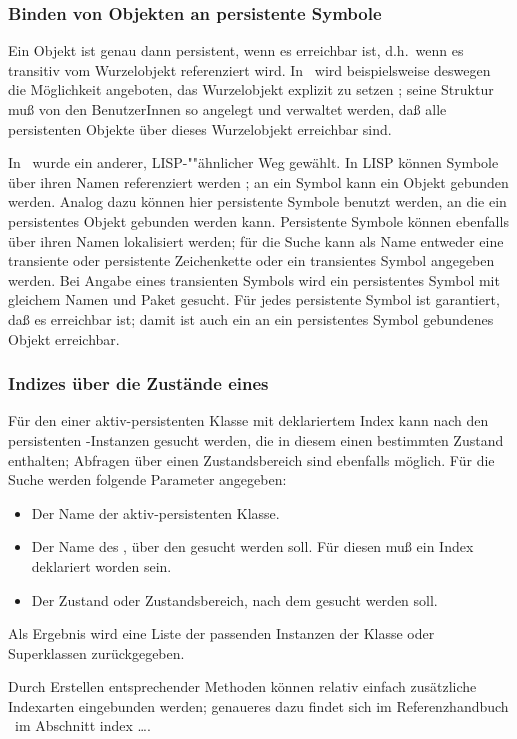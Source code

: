 \subsubsection{Binden von Objekten an persistente Symbole}%
\label{sec:psym}
%
Ein Objekt ist genau dann persistent, wenn es erreichbar ist, d.h.\
wenn es transitiv vom Wurzelobjekt referenziert wird. In
\wood\ wird beispielsweise deswegen die M\"{o}glichkeit angeboten, das
Wurzelobjekt explizit zu setzen \cite{bib:wo93}; seine Struktur mu\ss{}
von den BenutzerInnen so angelegt und verwaltet werden, da\ss{} alle
persistenten Objekte \"{u}ber dieses Wurzelobjekt erreichbar sind.
%
\par{}In \plob\ wurde ein anderer, LISP-""\"{a}hn\-li\-cher Weg gew\"{a}hlt.
In LISP k\"{o}n\-nen Symbole \"{u}ber ihren Namen referenziert werden
\stcite{13, 27}; an ein Symbol kann ein Objekt gebunden werden.
Analog dazu k\"{o}n\-nen hier persistente Symbole benutzt werden, an die
ein persistentes Objekt gebunden werden kann. Persistente Symbole
k\"{o}n\-nen ebenfalls \"{u}ber ihren Namen lokalisiert werden; f\"{u}r die
Suche kann als Name entweder eine transiente oder persistente
Zeichenkette oder ein transientes Symbol angegeben werden. Bei Angabe
eines transienten Symbols wird ein persistentes Symbol mit gleichem
Namen und Paket gesucht.  F\"{u}r jedes persistente Symbol ist
garantiert, da\ss{} es erreichbar ist; damit ist auch ein an ein
persistentes Symbol gebundenes Objekt erreichbar.
%
\subsubsection{Indizes \"{u}ber die Zust\"{a}nde eines \protect\Slt[s]}
%
F\"{u}r den \Slt\/ einer aktiv-persistenten Klasse mit deklariertem
Index kann nach den persistenten \clos-Instanzen gesucht
werden, die in diesem \Slt\/ einen bestimmten Zustand enthalten;
Abfragen \"{u}ber einen Zustandsbereich sind ebenfalls m\"{o}glich. F\"{u}r die
Suche werden folgende Parameter angegeben:
\begin{itemize}
\item Der Name der aktiv-persistenten Klasse.
\item Der Name des \Slt[s], \"{u}ber den gesucht werden soll. F\"{u}r diesen
\Slt\/ mu\ss{} ein Index deklariert worden sein.
\item Der Zustand oder Zustandsbereich, nach dem gesucht werden soll.
\end{itemize}
Als Ergebnis wird eine Liste der passenden Instanzen der Klasse oder
Superklassen zu\-r\"{u}ck\-ge\-ge\-ben.
%
\par{}Durch Erstellen entsprechender Methoden k\"{o}n\-nen relativ einfach
zu\-s\"{a}tz\-li\-che Indexarten eingebunden werden; genaueres dazu
findet sich im Referenzhandbuch \cite{bib:ki94b}\ im Abschnitt
\rglq{}index \ldots\rgrq.
%

